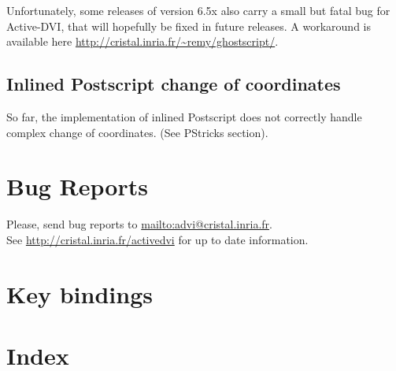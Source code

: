 \documentclass[12pt]{article}
\def \ActiveDVI {Active-DVI}
\begin{document}
Unfortunately, some releases of version 6.5x also carry a small but
fatal bug for \ActiveDVI, that will hopefully be fixed in future
releases. A workaround is available here
\url{http://cristal.inria.fr/~remy/ghostscript/}.

\subsection*{Inlined Postscript change of coordinates}

So far, the implementation of inlined Postscript does not correctly handle
complex change of coordinates.  (See PStricks section). 

\section {Bug Reports}

Please, send bug reports to 
\url{mailto:advi@cristal.inria.fr}. 
\\
See \url{http://cristal.inria.fr/activedvi} for up to date information.


\section {Key bindings}

\section {Index}

\printindex
\end{document}
